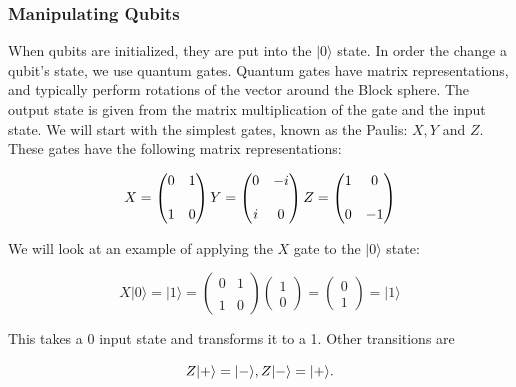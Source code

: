 \documentclass[11pt]{article}
\begin{document}
    \subsubsection{Manipulating Qubits}\label{manipulating-qubits}

    When qubits are initialized, they are put into the \(|0\rangle\) state.
In order the change a qubit's state, we use quantum gates. Quantum gates
have matrix representations, and typically perform rotations of the
vector around the Block sphere. The output state is given from the
matrix multiplication of the gate and the input state. We will start
with the simplest gates, known as the Paulis: \(X, Y\) and \(Z\). These
gates have the following matrix representations:

\[
X= \begin{pmatrix} 0&1 \\\\ 1&0 \end{pmatrix}\\\\
Y= \begin{pmatrix} 0&-i \\\\ i&0 \end{pmatrix}\\\\
Z= \begin{pmatrix} 1&0 \\\\ 0&-1 \end{pmatrix}
\]

We will look at an example of applying the \(X\) gate to the
\(|0\rangle\) state:

\[X |0\rangle = |1\rangle = \begin{pmatrix} 0&1 \\\\ 1&0 \end{pmatrix} \begin{pmatrix} 1 \\ 0 \end{pmatrix} = \begin{pmatrix} 0 \\ 1 \end{pmatrix} = |1\rangle\]

This takes a 0 input state and transforms it to a 1. Other transitions
are

\[
Z |+\rangle = |-\rangle, \\\\ Z |-\rangle = |+\rangle.
\]
\end{document}
